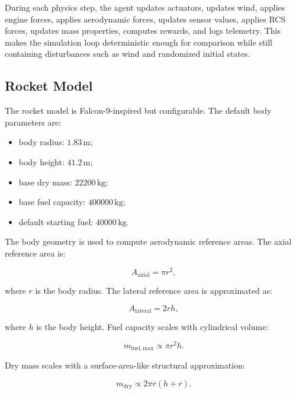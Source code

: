 \documentclass{article}
\begin{document}
During each physics step, the agent updates actuators, updates wind, applies engine forces, applies aerodynamic forces, updates sensor values, applies RCS forces, updates mass properties, computes rewards, and logs telemetry. This makes the simulation loop deterministic enough for comparison while still containing disturbances such as wind and randomized initial states.

\subsection{Rocket Model}

The rocket model is Falcon-9-inspired but configurable. The default body parameters are:

\begin{itemize}
    \item body radius: \(1.83\,\mathrm{m}\);
    \item body height: \(41.2\,\mathrm{m}\);
    \item base dry mass: \(22200\,\mathrm{kg}\);
    \item base fuel capacity: \(400000\,\mathrm{kg}\);
    \item default starting fuel: \(40000\,\mathrm{kg}\).
\end{itemize}

The body geometry is used to compute aerodynamic reference areas. The axial reference area is:

\begin{equation}
A_{\mathrm{axial}} = \pi r^2,
\end{equation}

where \(r\) is the body radius. The lateral reference area is approximated as:

\begin{equation}
A_{\mathrm{lateral}} = 2rh,
\end{equation}

where \(h\) is the body height. Fuel capacity scales with cylindrical volume:

\begin{equation}
m_{\mathrm{fuel,max}} \propto \pi r^2h.
\end{equation}

Dry mass scales with a surface-area-like structural approximation:

\begin{equation}
m_{\mathrm{dry}} \propto 2\pi r(h+r).
\end{equation}
\end{document}
